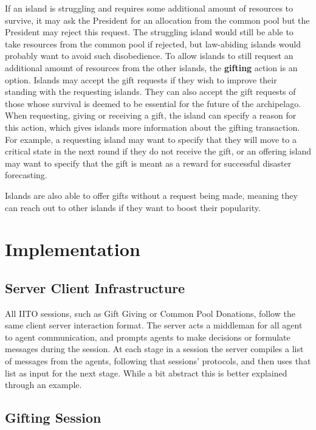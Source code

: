 If an island is struggling and requires some additional amount of resources to survive, it may ask the President for an allocation from the common pool but the President may reject this request. The struggling island would still be able to take resources from the common pool if rejected, but law-abiding islands would probably want to avoid such disobedience. To allow islands to still request an additional amount of resources from the other islands, the \textbf{gifting} action is an option. Islands may accept the gift requests if they wish to improve their standing with the requesting islands. They can also accept the gift requests of those whose survival is deemed to be essential for the future of the archipelago. When requesting, giving or receiving a gift, the island can specify a reason for this action, which gives islands more information about the gifting transaction. For example, a requesting island may want to specify that they will move to a critical state in the next round if they do not receive the gift, or an offering island may want to specify that the gift is meant as a reward for successful disaster forecasting.

Islands are also able to offer gifts without a request being made, meaning they can reach out to other islands if they want to boost their popularity.

\section{Implementation}
\label{sec:IITO:Implementation}

\subsection{Server Client Infrastructure}
\label{subsec:IITO:server_client_infrastructure}  

All IITO sessions, such as Gift Giving or Common Pool Donations, follow the same client server interaction format. The server acts a middleman for all agent to agent communication, and prompts agents to make decisions or formulate messages during the session. At each stage in a session the server compiles a list of messages from the agents, following that sessions' protocols, and then uses that list as input for the next stage. While a bit abstract this is better explained through an example.

\subsection{Gifting Session}
\label{subsec:IITO:gifting_session} 

